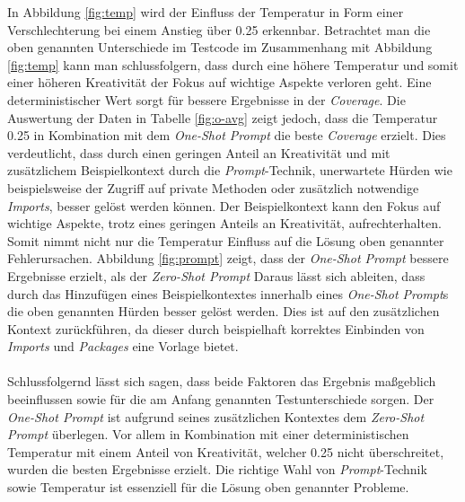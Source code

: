 In Abbildung \ref{fig:temp} wird der Einfluss der Temperatur in Form einer Verschlechterung bei einem Anstieg über 0.25 erkennbar. Betrachtet man die oben genannten Unterschiede im Testcode im Zusammenhang mit Abbildung \ref{fig:temp} kann man schlussfolgern, dass durch eine höhere Temperatur und somit einer höheren Kreativität der Fokus auf wichtige Aspekte verloren geht. Eine deterministischer Wert sorgt für bessere Ergebnisse in der \textit{Coverage}. Die Auswertung der Daten in Tabelle \ref{fig:o-avg} zeigt jedoch, dass die Temperatur 0.25 in Kombination mit dem \textit{One-Shot Prompt} die beste \textit{Coverage} erzielt. Dies verdeutlicht, dass durch einen geringen Anteil an Kreativität und mit zusätzlichem Beispielkontext durch die \textit{Prompt}-Technik, unerwartete Hürden wie beispielsweise der Zugriff auf private Methoden oder zusätzlich notwendige \textit{Imports}, besser gelöst werden können. Der Beispielkontext kann den Fokus auf wichtige Aspekte, trotz eines geringen Anteils an Kreativität, aufrechterhalten.\\
Somit nimmt nicht nur die Temperatur Einfluss auf die Lösung oben genannter Fehlerursachen. Abbildung \ref{fig:prompt} zeigt, dass der \textit{One-Shot Prompt} bessere Ergebnisse erzielt, als der \textit{Zero-Shot Prompt} Daraus lässt sich ableiten, dass durch das Hinzufügen eines Beispielkontextes innerhalb eines \textit{One-Shot Prompt}s die oben genannten Hürden besser gelöst werden. Dies ist auf den zusätzlichen Kontext zurückführen, da dieser durch beispielhaft korrektes Einbinden von \textit{Imports} und \textit{Packages} eine Vorlage bietet.\\\\
Schlussfolgernd lässt sich sagen, dass beide Faktoren das Ergebnis maßgeblich beeinflussen sowie für die am Anfang genannten Testunterschiede sorgen. Der \textit{One-Shot Prompt} ist aufgrund seines zusätzlichen Kontextes dem \textit{Zero-Shot Prompt} überlegen. Vor allem in Kombination mit einer deterministischen Temperatur mit einem Anteil von Kreativität, welcher 0.25 nicht überschreitet, wurden die besten Ergebnisse erzielt. Die richtige Wahl von \textit{Prompt}-Technik sowie Temperatur ist essenziell für die Lösung oben genannter Probleme.

